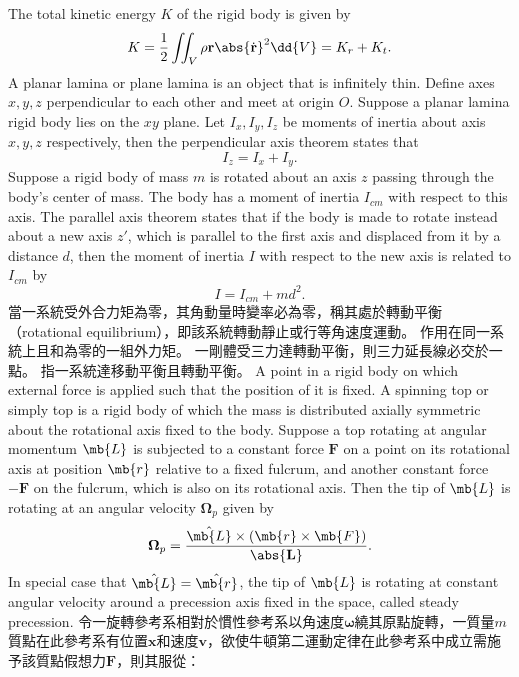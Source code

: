 \documentclass[a4paper,12pt]{article}
\begin{document}
The total kinetic energy $K$ of the rigid body is given by
\[K=\frac{1}{2}\iint_V\rho{\mathbf{r}}\abs{\dot{\mathbf{r}}}^2\dd{V}=K_r+K_t.\]
A planar lamina or plane lamina is an object that is infinitely thin.
Define axes $x,y,z$ perpendicular to each other and meet at origin $O$. Suppose a planar lamina rigid body lies on the $xy$ plane. Let $I_x,I_y,I_z$ be moments of inertia about axis $x,y,z$ respectively, then the perpendicular axis theorem states that
\[I_z=I_x+I_y.\]
Suppose a rigid body of mass $m$ is rotated about an axis $z$ passing through the body's center of mass. The body has a moment of inertia $I_{cm}$ with respect to this axis. The parallel axis theorem states that if the body is made to rotate instead about a new axis $z'$, which is parallel to the first axis and displaced from it by a distance $d$, then the moment of inertia $I$ with respect to the new axis is related to $I_{cm}$ by
\[I=I_{cm}+md^2.\]
當一系統受外合力矩為零，其角動量時變率必為零，稱其處於轉動平衡（rotational equilibrium），即該系統轉動靜止或行等角速度運動。
作用在同一系統上且和為零的一組外力矩。
一剛體受三力達轉動平衡，則三力延長線必交於一點。
指一系統達移動平衡且轉動平衡。
A point in a rigid body on which external force is applied such that the position of it is fixed.
A spinning top or simply top is a rigid body of which the mass is distributed axially symmetric about the rotational axis fixed to the body.
Suppose a top rotating at angular momentum $\mb{L}$ is subjected to a constant force $\mathbf{F}$ on a point on its rotational axis at position $\mb{r}$ relative to a fixed fulcrum, and another constant force $-\mathbf{F}$ on the fulcrum, which is also on its rotational axis. Then the tip of $\mb{L}$ is rotating at an angular velocity $\boldsymbol{\Omega}_p$ given by
\[\boldsymbol{\Omega}_p=
\frac{\hat{\mb{L}}\times(\mb{r}\times\mb{F})}{\abs{\mathbf{L}}}.\]
In special case that $\hat{\mb{L}}=\hat{\mb{r}}$, the tip of $\mb{L}$ is rotating at constant angular velocity around a precession axis fixed in the space, called steady precession.
令一旋轉參考系相對於慣性參考系以角速度$\boldsymbol{\omega}$繞其原點旋轉，一質量$m$質點在此參考系有位置$\mathbf{x}$和速度$\mathbf{v}$，欲使牛頓第二運動定律在此參考系中成立需施予該質點假想力$\mathbf{F}$，則其服從：
\end{document}
